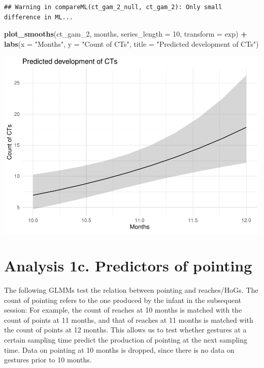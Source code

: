 \documentclass[]{article}
\newenvironment{Shaded}{\begin{snugshade}}{\end{snugshade}}
\newcommand{\DataTypeTok}[1]{\textcolor[rgb]{0.13,0.29,0.53}{#1}}
\newcommand{\DecValTok}[1]{\textcolor[rgb]{0.00,0.00,0.81}{#1}}
\newcommand{\KeywordTok}[1]{\textcolor[rgb]{0.13,0.29,0.53}{\textbf{#1}}}
\newcommand{\NormalTok}[1]{#1}
\newcommand{\OperatorTok}[1]{\textcolor[rgb]{0.81,0.36,0.00}{\textbf{#1}}}
\newcommand{\StringTok}[1]{\textcolor[rgb]{0.31,0.60,0.02}{#1}}
\begin{document}
\begin{verbatim}
## Warning in compareML(ct_gam_2_null, ct_gam_2): Only small difference in ML...
\end{verbatim}

\begin{Shaded}
\begin{Highlighting}[]
\KeywordTok{plot_smooths}\NormalTok{(ct_gam_}\DecValTok{2}\NormalTok{, months, }\DataTypeTok{series_length =} \DecValTok{10}\NormalTok{, }\DataTypeTok{transform =}\NormalTok{ exp) }\OperatorTok{+}
\StringTok{  }\KeywordTok{labs}\NormalTok{(}\DataTypeTok{x =} \StringTok{"Months"}\NormalTok{, }\DataTypeTok{y =} \StringTok{"Count of CTs"}\NormalTok{, }\DataTypeTok{title =} \StringTok{"Predicted development of CTs"}\NormalTok{)}
\end{Highlighting}
\end{Shaded}

\includegraphics{supplement_files/figure-latex/ct-gam-2-plot-1.pdf}

\newpage

\hypertarget{analysis-1c.-predictors-of-pointing}{%
\section{Analysis 1c. Predictors of
pointing}\label{analysis-1c.-predictors-of-pointing}}

The following GLMMs test the relation between pointing and reaches/HoGs.
The count of pointing refers to the one produced by the infant in the
subsequent session: For example, the count of reaches at 10 months is
matched with the count of points at 11 months, and that of reaches at 11
months is matched with the count of points at 12 months. This allows us
to test whether gestures at a certain sampling time predict the
production of pointing at the next sampling time. Data on pointing at 10
months is dropped, since there is no data on gestures prior to 10
months.
\end{document}
